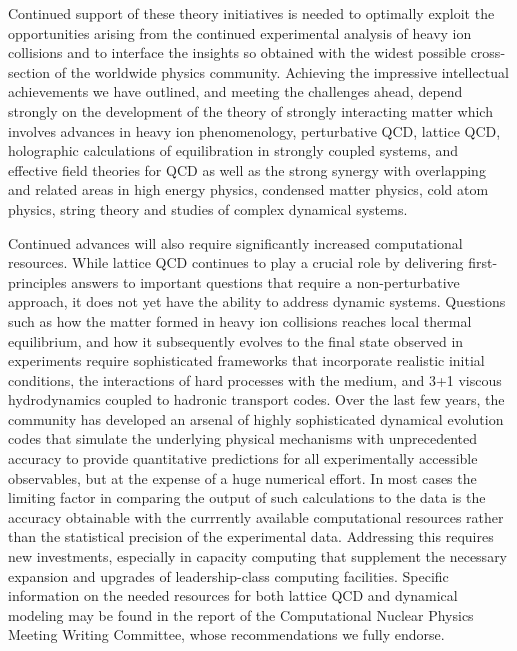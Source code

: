  





Continued support of these theory initiatives is needed to optimally exploit the
opportunities arising from the continued experimental analysis of heavy ion collisions 
and to interface the insights so obtained with the widest possible cross-section of
the worldwide physics community.
Achieving the impressive intellectual achievements we have 
outlined, and meeting the challenges ahead, depend strongly on the development of the theory of 
strongly interacting matter which involves advances in heavy ion phenomenology, 
perturbative QCD, lattice QCD, holographic calculations of equilibration in 
strongly coupled systems, and effective field theories for QCD as well as the strong synergy with 
overlapping and related areas in high energy physics, condensed matter physics, cold atom physics, string theory and studies of complex dynamical systems. 

Continued advances will also require significantly increased computational resources. 
While lattice QCD continues to play a crucial role by delivering first-principles answers to important questions that require a non-perturbative approach, it does not yet have the ability to address dynamic systems.
Questions such as how the matter formed in heavy ion collisions reaches local thermal equilibrium, 
and how it subsequently evolves to the final state observed in experiments
require sophisticated frameworks that incorporate realistic initial conditions, the interactions of hard processes with the medium, 
and 3+1 viscous hydrodynamics coupled to hadronic transport codes.
Over the last few years, 
the community has developed an arsenal of highly sophisticated dynamical evolution codes 
that simulate the underlying physical mechanisms with unprecedented accuracy 
to provide quantitative predictions for all experimentally accessible observables, 
but at the expense of a huge numerical effort.
In most cases the limiting factor in comparing the output of such calculations to the data
is the accuracy obtainable with the currrently available computational resources rather than the statistical precision of the experimental data. 
Addressing this requires new investments, especially in capacity computing that supplement 
the necessary expansion and upgrades of leadership-class computing facilities.
Specific information on the needed resources for both lattice QCD and dynamical modeling may be found in the report of the Computational Nuclear Physics Meeting Writing Committee\cite{CompReport}, whose 
recommendations we fully endorse.


           


